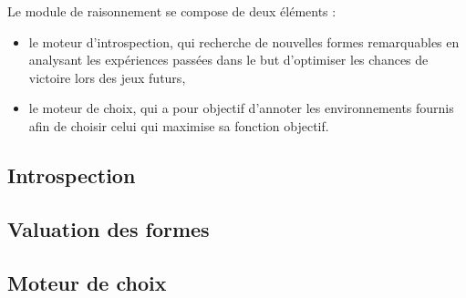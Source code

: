 Le module de raisonnement se compose de deux éléments : 
\begin{itemize}
\item le moteur d'introspection, qui recherche de nouvelles formes remarquables en analysant les expériences passées dans le but d'optimiser les chances de victoire lors des jeux futurs,
\item le moteur de choix, qui a pour objectif d'annoter les environnements fournis afin de choisir celui qui maximise sa fonction objectif.
\end{itemize}


\subsection{Introspection}



\subsection{Valuation des formes}



\subsection{Moteur de choix}



